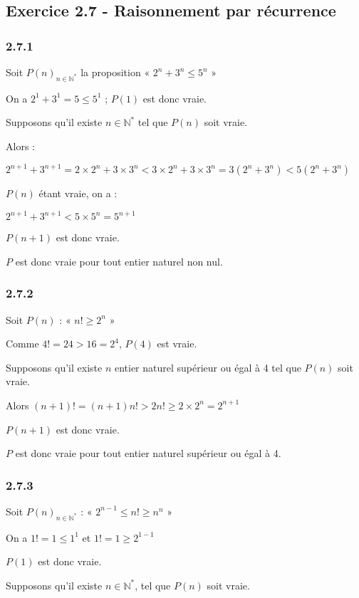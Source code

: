 \documentclass[a4paper,10pt]{report}
\begin{document}
\subsection*{Exercice 2.7 - Raisonnement par récurrence}

\subsubsection*{2.7.1}

Soit $P(n)_{n \in \mathbb{N}^*}$ la proposition « $2^n + 3^n \leq 5^n$ »

On a $2^1 + 3^1 = 5 \leq 5^1$ ; $P(1)$ est donc vraie.

Supposons qu'il existe $n \in \mathbb{N}^*$ tel que $P(n)$ soit vraie.

Alors :

$2^{n+1} + 3^{n+1} = 2 \times 2^n + 3 \times 3^n < 3 \times 2^n + 3 \times 3^n = 3(2^n + 3^n) < 5(2^n + 3^n)$

$P(n)$ étant vraie, on a :

$2^{n+1} + 3^{n+1} < 5 \times 5^n = 5^{n+1}$

$P(n+1)$ est donc vraie.

$P$ est donc vraie pour tout entier naturel non nul.


\subsubsection*{2.7.2}

Soit $P(n)$ : « $n! \geq 2^n$ »

Comme $4! = 24 > 16 = 2^4$, $P(4)$ est vraie.

Supposons qu'il existe $n$ entier naturel supérieur ou égal à 4 tel que $P(n)$ soit vraie.

Alors $(n+1)! = (n+1) n! > 2n! \geq 2 \times 2^n = 2^{n+1}$

$P(n+1)$ est donc vraie.

$P$ est donc vraie pour tout entier naturel supérieur ou égal à 4.


\subsubsection*{2.7.3}

Soit $P(n)_{n \in \mathbb{N}^*}$ : « $2^{n-1} \leq n! \geq n^n$ »

On a $1! = 1 \leq 1^1$ et $1! = 1 \geq 2^{1-1}$

$P(1)$ est donc vraie.

Supposons qu'il existe $n \in \mathbb{N}^*$, tel que $P(n)$ soit vraie.
\end{document}
